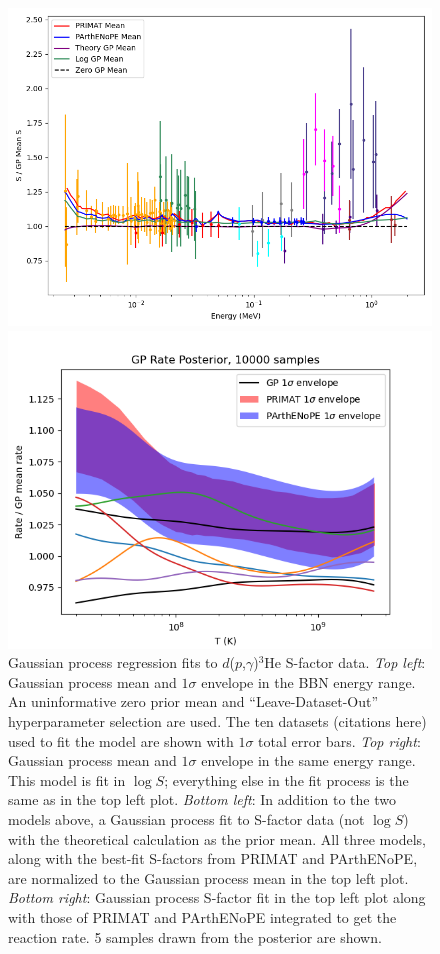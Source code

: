 \documentclass[%
 reprint,
superscriptaddress,
nofootinbib,
 amsmath,amssymb,
 aps,
 pra,
]{revtex4-2}
\begin{document}
\begin{figure}
\begin{minipage}{.48\textwidth}
		\includegraphics[width=\linewidth]{Figures/dphe3g_S_comp.png}	
	\end{minipage}
	\hspace{0mm}
	\begin{minipage}{.48\textwidth}
    		\centering
		\includegraphics[width=\linewidth]{Figures/dphe3g_rate.png}	
	\end{minipage}
    	\caption{Gaussian process regression fits to $d$($p$,$\gamma$)$^3$He S-factor data. \textit{Top left}: Gaussian process mean and $1\sigma$ envelope in the BBN energy range. An uninformative zero prior mean and ``Leave-Dataset-Out'' hyperparameter selection are used. The ten datasets (citations here) used to fit the model are shown with $1\sigma$ total error bars. \textit{Top right}: Gaussian process mean and $1\sigma$ envelope in the same energy range. This model is fit in $\log S$; everything else in the fit process is the same as in the top left plot. \textit{Bottom left}: In addition to the two models above, a Gaussian process fit to S-factor data (not $\log S$) with the theoretical calculation as the prior mean. All three models, along with the best-fit S-factors from PRIMAT and PArthENoPE, are normalized to the Gaussian process mean in the top left plot. \textit{Bottom right}: Gaussian process S-factor fit in the top left plot along with those of PRIMAT and PArthENoPE integrated to get the reaction rate. 5 samples drawn from the posterior are shown. }

\end{figure}
\end{document}
